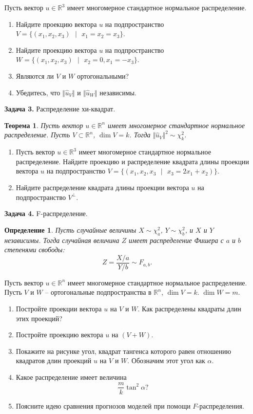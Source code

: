 \documentclass[10pt, a4paper]{extarticle}
\newtheorem{theor}{Теорема}
\newtheorem{defn}{Определение}
\def \R{\mathbb{R}}
\begin{document}
	Пусть вектор $u \in \R^3$ имеет многомерное стандартное нормальное распределение.
	\begin{enumerate}[label=\textbf{\alph*)}]
		\item Найдите проекцию вектора $u$ на подпространство $V = \{(x_1, x_2, x_3) \text{ }| \text{ } x_1 = x_2 = x_3\}$.
		\item Найдите проекцию вектора $u$ на подпространство
		$W = \{(x_1, x_2, x_3) \text{ }| \text{ } x_2 = 0, x_1 = -x_3\}$.
		\item Являются ли $V$ и $W$ ортогональными?
		\item Убедитесь, что $\Vert\hat{u}_V\Vert$ и $\Vert\hat{u}_W\Vert$ независимы.
	\end{enumerate} 
	\vspace{1em}
	
	{\Large \textbf{Задача 3.} Распределение хи-квадрат.}
	\begin{theor}
		Пусть вектор $u \in \R^n$ имеет многомерное стандартное нормальное распределение. Пусть $V \subset \R^n$, $\dim V = k$. Тогда $\Vert\hat{u}_V\Vert^2 \sim \chi^2_k$.
	\end{theor}

	\begin{enumerate}[label=\textbf{\alph*)}]
		\item Пусть вектор $u \in \R^3$ имеет многомерное стандартное нормальное распределение. Найдите проекцию и распределение квадрата длины проекции вектора $u$ на подпространство $V = \{(x_1, x_2, x_3 \text{ } | \text{ } x_3 = 2x_1 + x_2)\}$.
		\item Найдите распределение квадрата длины проекции вектора $u$ на подпространство $V^{\perp}$.
	\end{enumerate}
	\vspace{1em}

	{\Large \textbf{Задача 4.} F-распределение.}
	\begin{defn}
		Пусть случайные величины $X \sim \chi^2_{a}$, $Y \sim \chi^2_{b}$, и $X$ и $Y$ независимы. Тогда случайная величина $Z$ имеет распределение Фишера с $a$ и $b$ степенями свободы:
		\[
		Z = \dfrac{X/a}{Y/b} \sim F_{a, b}.
		\]
	\end{defn}
	
	Пусть вектор $u \in \R^n$ имеет многомерное стандартное нормальное распределение. Пусть $V$ и $W$ -- ортогональные подпространства в $\R^n$, $\dim V = k$. $\dim W = m$.
	\begin{enumerate}[label=\textbf{\alph*)}]
		\item Постройте проекции вектора $u$ на $V$ и $W$. Как распределены квадраты длин этих проекций?
		\item Постройте проекцию вектора $u$ на $(V + W)$.
		\item Покажите на рисунке угол, квадрат тангенса которого равен отношению квадратов длин проекций $u$ на $V$ и $W$. Обозначим этот угол как $\alpha$.
		\item Какое распределение имеет величина
		\[
		\dfrac{m}{k}\tan^2 \alpha ?
		\]
		\item Поясните идею сравнения прогнозов моделей при помощи $F$-распределения.
	\end{enumerate}
	\vspace{1em}
\end{document}
